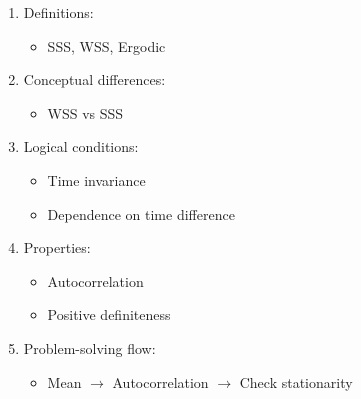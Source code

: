 \documentclass[12pt]{article}
\begin{document}
\begin{enumerate}
    \item Definitions:
    \begin{itemize}
        \item SSS, WSS, Ergodic
    \end{itemize}
    \item Conceptual differences:
    \begin{itemize}
        \item WSS vs SSS
    \end{itemize}
    \item Logical conditions:
    \begin{itemize}
        \item Time invariance
        \item Dependence on time difference
    \end{itemize}
    \item Properties:
    \begin{itemize}
        \item Autocorrelation
        \item Positive definiteness
    \end{itemize}
    \item Problem-solving flow:
    \begin{itemize}
        \item Mean $\rightarrow$ Autocorrelation $\rightarrow$ Check stationarity
    \end{itemize}
\end{enumerate}
\end{document}
